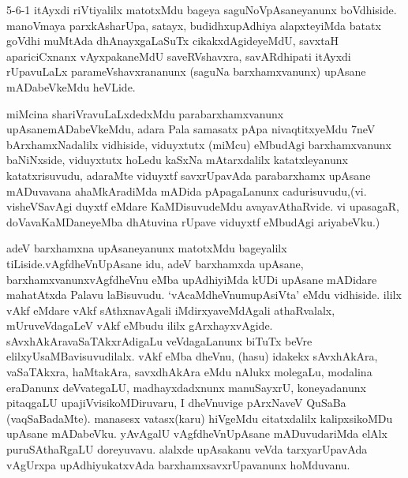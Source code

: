 
\begin{artha}
5-6-1 itAyxdi riVtiyalilx matotxMdu bageya saguNoVpAsaneyanunx boVdhiside. manoVmaya parxkAsharUpa, satayx, budidhx\break upAdhiya alapxteyiMda batatx goVdhi muMtAda dhAnayxgaLaSuTx cikakxdAgideyeMdU, savxtaH apariciCxnanx vAyxpakaneMdU saveRVshavxra, savARdhipati itAyxdi rUpavuLaLx parameVshavxrananunx (saguNa barxhamxvanunx) upAsane mADabeVkeMdu heVLide.
\end{artha}


\begin{artha}
miMcina shariVravuLaLxdedxMdu parabarxhamxvanunx upAsane\-\break mADabeVkeMdu, adara Pala samasatx pApa nivaqtitxyeMdu 7neV bArxhamxNadalilx vidhiside, viduyxtutx (miMcu) eMbudAgi barxhamxvanunx baNiNxside, viduyxtutx hoLedu kaSxNa mAtarxdalilx katatxleyanunx katatxrisuvudu, adaraMte viduyxtf savxrUpavAda parabarxhamx upAsane mADuvavana ahaMkAradiMda mADida pApagaLanunx cadurisuvudu,\break (vi. visheVSavAgi duyxtf eMdare KaMDisuvudeMdu avayavAthaRvide. vi upasagaR, doVavaKaMDaneyeMba dhAtuvina rUpave viduyxtf eMbudAgi ariyabeVku.)
\end{artha}


\begin{artha}
adeV barxhamxna upAsaneyanunx matotxMdu bageyalilx tiLiside.\break vAgfdheVnUpAsane idu, adeV barxhamxda upAsane, barxhamxvanunx\break vAgfdheVnu eMba upAdhiyiMda kUDi upAsane mADidare mahatAtxda Palavu laBisuvudu. `vAcaMdheVnumupAsiVta' eMdu vidhiside. ililx vAkf eMdare vAkf sAthxnavAgali iMdirxyaveMdAgali athaRvalalx, mUruveVdagaLeV vAkf eMbudu ililx gArxhayxvAgide. sAvxhAkAravaSaTAkxrAdigaLu veVdagaLanunx biTuTx beVre elilxyU\break saMBavisuvudilalx. vAkf eMba dheVnu, (hasu) idakekx sAvxhAkAra, vaSaTAkxra, haMtakAra, savxdhAkAra eMdu nAlukx molegaLu, modalina eraDanunx deVvategaLU, madhayxdadxnunx manuSayxrU, koneyadanunx pitaqgaLU upajiVvisikoMDiruvaru, I dheVnuvige pArxNaveV QuSaBa (vaqSaBadaMte). manasesx vatasx(karu) hiVgeMdu citatxdalilx kalipxsikoMDu upAsane mADabeVku. yAvAgalU vAgfdheVnUpAsane mADuvudariMda elAlx puruSAthaRgaLU doreyuvavu. alalxde upAsakanu veVda tarxyarUpavAda vAgUrxpa upAdhiyukatxvAda barxhamxsavxrUpavanunx hoMduvanu.
\end{artha}

